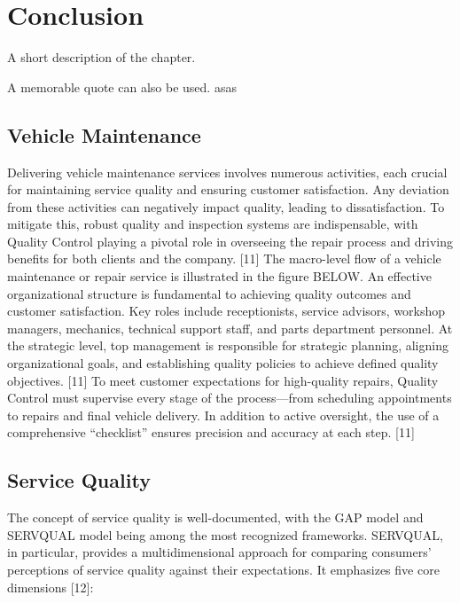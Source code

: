 \chapter{Conclusion}%
\label{chapter:conclusion}

\begin{introduction}
A short description of the chapter.

A memorable quote can also be used. asas
\end{introduction} 


\section{Vehicle Maintenance}

Delivering vehicle maintenance services involves numerous activities, each crucial for maintaining service quality and ensuring customer satisfaction. Any deviation from these activities can negatively impact quality, leading to dissatisfaction. To mitigate this, robust quality and inspection systems are indispensable, with Quality Control playing a pivotal role in overseeing the repair process and driving benefits for both clients and the company. [11]
The macro-level flow of a vehicle maintenance or repair service is illustrated in the figure BELOW. An effective organizational structure is fundamental to achieving quality outcomes and customer satisfaction. Key roles include receptionists, service advisors, workshop managers, mechanics, technical support staff, and parts department personnel. At the strategic level, top management is responsible for strategic planning, aligning organizational goals, and establishing quality policies to achieve defined quality objectives. [11]
To meet customer expectations for high-quality repairs, Quality Control must supervise every stage of the process—from scheduling appointments to repairs and final vehicle delivery. In addition to active oversight, the use of a comprehensive “checklist” ensures precision and accuracy at each step. [11]

\section{Service Quality}
The concept of service quality is well-documented, with the GAP model and SERVQUAL model being among the most recognized frameworks. SERVQUAL, in particular, provides a multidimensional approach for comparing consumers’ perceptions of service quality against their expectations. It emphasizes five core dimensions [12]:

